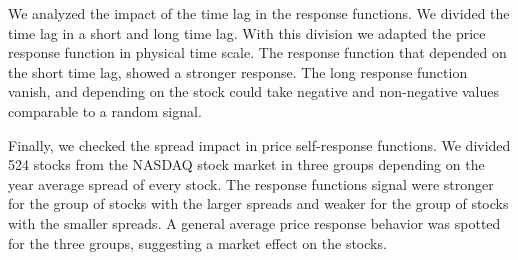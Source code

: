 We analyzed the impact of the time lag in the response functions. We divided
the time lag in a short and long time lag. With this division we adapted the
price response function in physical time scale. The response function that
depended on the short time lag, showed a stronger response. The long response
function vanish, and depending on the stock could take negative and
non-negative values comparable to a random signal.

Finally, we checked the spread impact in price self-response functions. We
divided 524 stocks from the NASDAQ stock market in three groups depending on
the year average spread of every stock. The response functions signal were
stronger for the group of stocks with the larger spreads and weaker for the
group of stocks with the smaller spreads. A general average price response
behavior was spotted for the three groups, suggesting a market effect on the
stocks.
